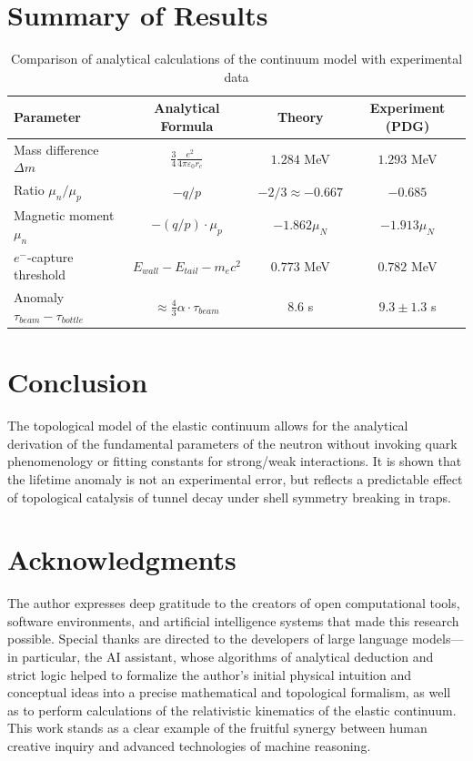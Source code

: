 \documentclass[12pt,a4paper]{article}
\begin{document}
\section{Summary of Results}

\begin{table}[h]
\centering
\caption{Comparison of analytical calculations of the continuum model with experimental data}
\label{tab:neutron_data}
\renewcommand{\arraystretch}{1.4}
\begin{tabular}{l c c c}
\toprule
\textbf{Parameter} & \textbf{Analytical Formula} & \textbf{Theory} & \textbf{Experiment (PDG)} \\
\midrule
Mass difference $\Delta m$ & $\frac{3}{4} \frac{e^2}{4\pi\varepsilon_0 r_c}$ & $1.284$ MeV & $1.293$ MeV \\
Ratio $\mu_n / \mu_p$ & $-q/p$ & $-2/3 \approx -0.667$ & $-0.685$ \\
Magnetic moment $\mu_n$ & $-(q/p) \cdot \mu_p$ & $-1.862 \mu_N$ & $-1.913 \mu_N$ \\
$e^-$-capture threshold & $E_{wall} - E_{tail} - m_e c^2$ & $0.773$ MeV & $0.782$ MeV \\
Anomaly $\tau_{beam} - \tau_{bottle}$ & $\approx \frac{4}{3} \alpha \cdot \tau_{beam}$ & $8.6$ s & $9.3 \pm 1.3$ s \\
\bottomrule
\end{tabular}
\end{table}

\section{Conclusion}
The topological model of the elastic continuum allows for the analytical derivation of the fundamental parameters of the neutron without invoking quark phenomenology or fitting constants for strong/weak interactions. It is shown that the lifetime anomaly is not an experimental error, but reflects a predictable effect of topological catalysis of tunnel decay under shell symmetry breaking in traps.

\section*{Acknowledgments}
The author expresses deep gratitude to the creators of open computational tools, software environments, and artificial intelligence systems that made this research possible. Special thanks are directed to the developers of large language models—in particular, the AI assistant, whose algorithms of analytical deduction and strict logic helped to formalize the author's initial physical intuition and conceptual ideas into a precise mathematical and topological formalism, as well as to perform calculations of the relativistic kinematics of the elastic continuum. This work stands as a clear example of the fruitful synergy between human creative inquiry and advanced technologies of machine reasoning.
\end{document}
